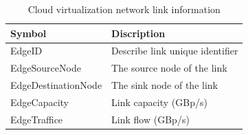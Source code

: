 \documentclass[journal]{IEEEtran}
\begin{document}
    \begin{table}[!t]
        \renewcommand{\arraystretch}{1.3}
        \caption{Cloud virtualization network link information}
        \label{tab2}
        \centering
        \begin{tabular}{|l||l|}
            \hline
            Symbol              & Discription                     \\
            \hline
            EdgeID              & Describe link unique identifier \\
            EdgeSourceNode      & The source node of the link     \\
            EdgeDestinationNode & The sink node of the link       \\
            EdgeCapacity        & Link capacity (GBp/s)           \\
            EdgeTraffice        & Link flow (GBp/s)               \\
            \hline
        \end{tabular}
    \end{table}
\end{document}
